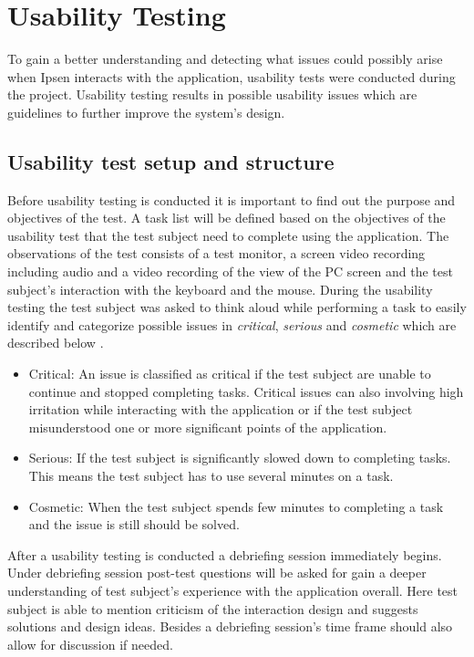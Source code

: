 \section{Usability Testing} \label{sec:usabilitytesting}

To gain a better understanding and detecting what issues could possibly arise when Ipsen interacts with the application, usability tests were conducted during the project. 
Usability testing results in possible usability issues which are guidelines to further improve the system's design. 

\subsection{Usability test setup and structure}
Before usability testing is conducted it is important to find out the purpose and objectives of the test. 
A task list will be defined based on the objectives of the usability test that the test subject need to complete using the application. The observations of the test consists of a test monitor, a screen video recording including audio and a video recording of the view of the PC screen and the test subject's interaction with the keyboard and the mouse. 
During the usability testing the test subject was asked to think aloud while performing a task to easily identify and categorize possible issues in \textit{critical}, \textit{serious} and \textit{cosmetic} which are described below \citep[p.~154]{brugervenligtwebdesign}.

\begin{itemize}
  \item Critical: An issue is classified as critical if the test subject are unable to continue and stopped completing tasks.
Critical issues can also involving high irritation while interacting with the application or if the test subject misunderstood one or more significant points of the application.
  \item Serious: If the test subject is significantly slowed down to completing tasks. 
This means the test subject has to use several minutes on a task.
	\item Cosmetic: When the test subject spends few minutes to completing a task and the issue is still should be solved. 
\end{itemize}

After a usability testing is conducted a debriefing session immediately  begins. 
Under debriefing session post-test questions will be asked for gain a deeper understanding of test subject's experience with the application overall. 
Here test subject is able to mention criticism of the interaction design and suggests solutions and design ideas. 
Besides a debriefing session's time frame should also allow for discussion if needed. 

